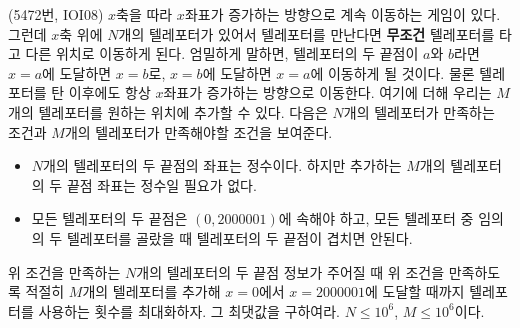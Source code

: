 \begin{problem}
    (5472번, IOI08) $x$축을 따라 $x$좌표가 증가하는 방향으로 계속 이동하는 게임이 있다. 그런데 $x$축 위에 $N$개의 텔레포터가 있어서 텔레포터를 만난다면 \textbf{무조건} 텔레포터를 타고 다른 위치로 이동하게 된다. 엄밀하게 말하면, 텔레포터의 두 끝점이 $a$와 $b$라면 $x=a$에 도달하면 $x=b$로, $x=b$에 도달하면 $x=a$에 이동하게 될 것이다. 물론 텔레포터를 탄 이후에도 항상 $x$좌표가 증가하는 방향으로 이동한다.
    여기에 더해 우리는 $M$개의 텔레포터를 원하는 위치에 추가할 수 있다. 다음은 $N$개의 텔레포터가 만족하는 조건과 $M$개의 텔레포터가 만족해야할 조건을 보여준다.
    \begin{itemize}
        \item $N$개의 텔레포터의 두 끝점의 좌표는 정수이다. 하지만 추가하는 $M$개의 텔레포터의 두 끝점 좌표는 정수일 필요가 없다.
        \item 모든 텔레포터의 두 끝점은 $(0, 2000001)$에 속해야 하고, 모든 텔레포터 중 임의의 두 텔레포터를 골랐을 때 텔레포터의 두 끝점이 겹치면 안된다. 
    \end{itemize}
    위 조건을 만족하는 $N$개의 텔레포터의 두 끝점 정보가 주어질 때 위 조건을 만족하도록 적절히 $M$개의 텔레포터를 추가해 $x=0$에서 $x=2000001$에 도달할 때까지 텔레포터를 사용하는 횟수를 최대화하자. 그 최댓값을 구하여라. $N \leq 10^6$, $M \leq 10^6$이다.
\end{problem}